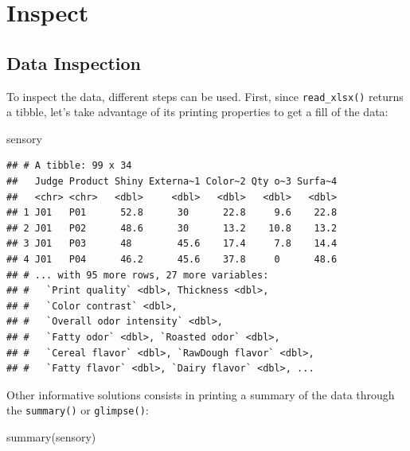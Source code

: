 \documentclass[
]{krantz}
\makeatletter
\newenvironment{Shaded}{\begin{snugshade}}{\end{snugshade}}
\newcommand{\FunctionTok}[1]{\textcolor[rgb]{0,0,0}{#1}}
\newcommand{\NormalTok}[1]{#1}
\newenvironment{kframe}{%
\medskip{}
\setlength{\fboxsep}{.8em}
 \def\at@end@of@kframe{}%
 \ifinner\ifhmode%
  \def\at@end@of@kframe{\end{minipage}}%
  \begin{minipage}{\columnwidth}%
 \fi\fi%
 \def\FrameCommand##1{\hskip\@totalleftmargin \hskip-\fboxsep
 \colorbox{shadecolor}{##1}\hskip-\fboxsep
     \hskip-\linewidth \hskip-\@totalleftmargin \hskip\columnwidth}%
 \MakeFramed {\advance\hsize-\width
   \@totalleftmargin\z@ \linewidth\hsize
   \@setminipage}}%
 {\par\unskip\endMakeFramed%
 \at@end@of@kframe}
\renewenvironment{Shaded}{\begin{kframe}}{\end{kframe}}
\makeatother
\begin{document}
\hypertarget{inspect}{%
\section{Inspect}\label{inspect}}

\hypertarget{data-inspection}{%
\subsection{Data Inspection}\label{data-inspection}}

To inspect the data, different steps can be used.
First, since \texttt{read\_xlsx()} returns a tibble, let's take advantage of its printing properties to get a fill of the data:

\begin{Shaded}
\begin{Highlighting}[]
\NormalTok{sensory}
\end{Highlighting}
\end{Shaded}

\begin{verbatim}
## # A tibble: 99 x 34
##   Judge Product Shiny Externa~1 Color~2 Qty o~3 Surfa~4
##   <chr> <chr>   <dbl>     <dbl>   <dbl>   <dbl>   <dbl>
## 1 J01   P01      52.8      30      22.8     9.6    22.8
## 2 J01   P02      48.6      30      13.2    10.8    13.2
## 3 J01   P03      48        45.6    17.4     7.8    14.4
## 4 J01   P04      46.2      45.6    37.8     0      48.6
## # ... with 95 more rows, 27 more variables:
## #   `Print quality` <dbl>, Thickness <dbl>,
## #   `Color contrast` <dbl>,
## #   `Overall odor intensity` <dbl>,
## #   `Fatty odor` <dbl>, `Roasted odor` <dbl>,
## #   `Cereal flavor` <dbl>, `RawDough flavor` <dbl>,
## #   `Fatty flavor` <dbl>, `Dairy flavor` <dbl>, ...
\end{verbatim}

Other informative solutions consists in printing a summary of the data through the \texttt{summary()} or \texttt{glimpse()}:

\begin{Shaded}
\begin{Highlighting}[]
\FunctionTok{summary}\NormalTok{(sensory)}
\end{Highlighting}
\end{Shaded}
\end{document}
